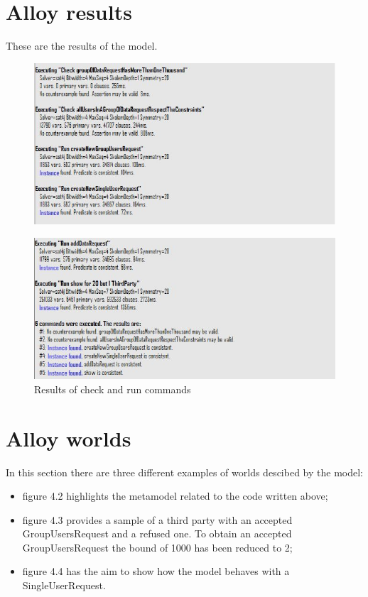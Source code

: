 \section{Alloy results}
 These are the results of the model.
\begin{figure}[h!]
	\includegraphics[width=1.00\textwidth]{./pictures/alloy_execute1.JPG}
\end{figure}
\begin{figure}[h!]
	\includegraphics[width=1.00\textwidth]{./pictures/alloy_execute2.JPG}\par
	\caption{Results of check and run commands}
\end{figure}

\section{Alloy worlds}
In this section there are three different examples of worlds descibed by the model:
\begin{itemize}
	\item figure 4.2 highlights the metamodel related to the code written above;
	\item figure 4.3 provides a sample of a third party with an accepted GroupUsersRequest and a refused one. To obtain an 			accepted GroupUsersRequest the bound of 1000 has been reduced to 2; 
	\item figure 4.4 has the aim to show how the model behaves with a SingleUserRequest.
	
\end{itemize}

